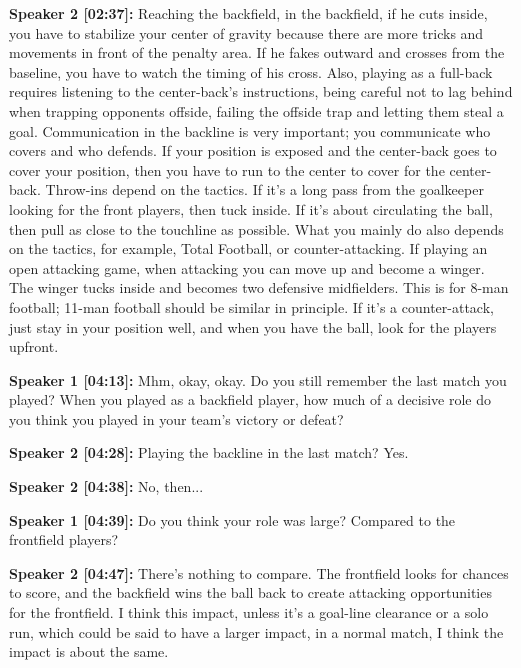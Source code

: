 \documentclass[11pt,a4paper]{article}
\begin{document}
\begin{linenumbers}
\vspace{0.5em}
\noindent \textbf{Speaker 2 [02:37]:} Reaching the backfield, in the backfield, if he cuts inside, you have to stabilize your center of gravity because there are more tricks and movements in front of the penalty area. If he fakes outward and crosses from the baseline, you have to watch the timing of his cross. Also, playing as a full-back requires listening to the center-back's instructions, being careful not to lag behind when trapping opponents offside, failing the offside trap and letting them steal a goal. Communication in the backline is very important; you communicate who covers and who defends. If your position is exposed and the center-back goes to cover your position, then you have to run to the center to cover for the center-back. Throw-ins depend on the tactics. If it's a long pass from the goalkeeper looking for the front players, then tuck inside. If it's about circulating the ball, then pull as close to the touchline as possible. What you mainly do also depends on the tactics, for example, Total Football, or counter-attacking. If playing an open attacking game, when attacking you can move up and become a winger. The winger tucks inside and becomes two defensive midfielders. This is for 8-man football; 11-man football should be similar in principle. If it's a counter-attack, just stay in your position well, and when you have the ball, look for the players upfront.

\vspace{0.5em}
\noindent \textbf{Speaker 1 [04:13]:} Mhm, okay, okay. Do you still remember the last match you played? When you played as a backfield player, how much of a decisive role do you think you played in your team's victory or defeat?

\vspace{0.5em}
\noindent \textbf{Speaker 2 [04:28]:} Playing the backline in the last match? Yes.

\vspace{0.5em}
\noindent \textbf{Speaker 2 [04:38]:} No, then...

\vspace{0.5em}
\noindent \textbf{Speaker 1 [04:39]:} Do you think your role was large? Compared to the frontfield players?

\vspace{0.5em}
\noindent \textbf{Speaker 2 [04:47]:} There's nothing to compare. The frontfield looks for chances to score, and the backfield wins the ball back to create attacking opportunities for the frontfield. I think this impact, unless it's a goal-line clearance or a solo run, which could be said to have a larger impact, in a normal match, I think the impact is about the same.


\end{linenumbers}
\end{document}
